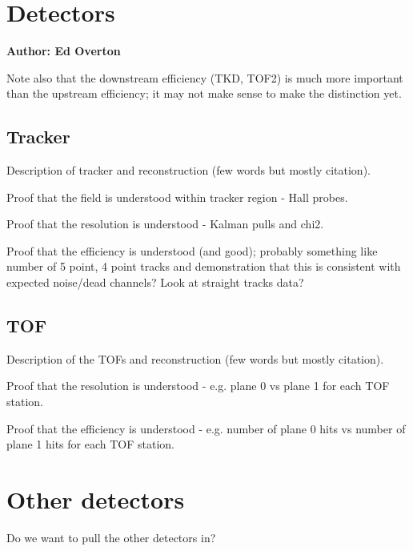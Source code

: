 \section{Detectors}
\label{Sect:Detectors}

\textbf{Author: Ed Overton}

Note also that the downstream efficiency (TKD, TOF2) is much more important than 
the upstream efficiency; it may not make sense to make the distinction yet.

\subsection{Tracker}

Description of tracker and reconstruction (few words but mostly citation).

Proof that the field is understood within tracker region - Hall probes.

Proof that the resolution is understood - Kalman pulls and chi2. 

Proof that the efficiency is understood (and good); probably something like 
number of 5 point, 4 point tracks and demonstration that this is consistent with
expected noise/dead channels? Look at straight tracks data?

\subsection{TOF}

Description of the TOFs and reconstruction (few words but mostly citation).

Proof that the resolution is understood - e.g. plane 0 vs plane 1 for each TOF station.

Proof that the efficiency is understood - e.g. number of plane 0 hits vs number 
of plane 1 hits for each TOF station.

\section{Other detectors}

Do we want to pull the other detectors in?


